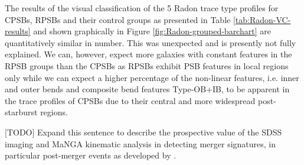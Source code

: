 The results of the visual classification of the 5 Radon trace type profiles for CPSBs, RPSBs and their control groups as presented in Table \ref{tab:Radon-VC-results} and shown graphically in Figure \ref{fig:Radon-grouped-barchart} are quantitatively similar in number. This was unexpected and is presently not fully explained. We can, however, expect more galaxies with constant features in the RPSB groups than the CPSBs as RPSBs exhibit PSB features in local regions only while we can expect a higher percentage of the non-linear features, i.e. inner and outer bends and composite bend features Type-OB+IB, to be apparent in the trace profiles of CPSBs due to their central and more widespread post-starburst regions. 

[TODO] Expand this sentence to describe the prospective value of the SDSS imaging and MaNGA kinematic analysis in detecting merger signatures, in particular post-merger events as developed by \cite{2019DDA....5020304N}.